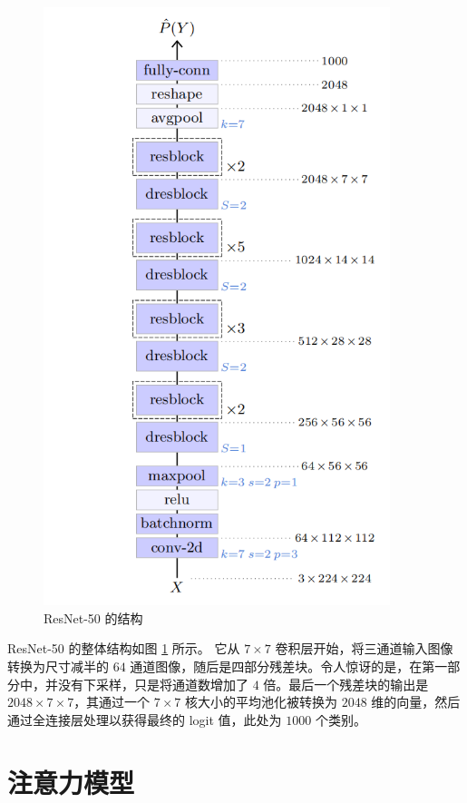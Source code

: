 \begin{figure}
    \centering
    \includegraphics[width=0.9\textwidth]{fig/fig5.5.png}
    \caption[ResNet-50]{ResNet-50 的结构 \citep{arxiv-1512.03385}}
    \label{fig5.5}
\end{figure}

ResNet-50 的整体结构如图 \ref{fig5.5} 所示。 它从 $7 \times 7$ 卷积层开始，将三通道输入图像转换为尺寸减半的 $64$ 通道图像，随后是四部分残差块。令人惊讶的是，在第一部分中，并没有下采样，只是将通道数增加了 $4$ 倍。最后一个残差块的输出是 $2048 \times 7 \times 7$，其通过一个 $7 \times 7$ 核大小的平均池化被转换为 $2048$ 维的向量，然后通过全连接层处理以获得最终的 logit 值，此处为 $1000$ 个类别。

\section{注意力模型}\label{sec5.3}

